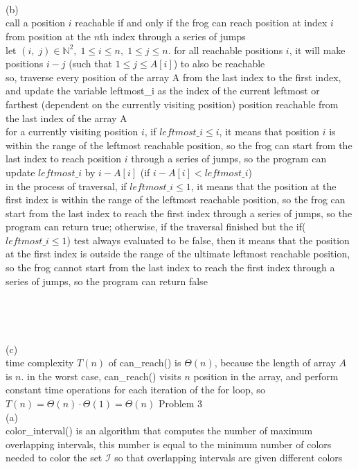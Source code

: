 \documentclass[12pt,border=4pt,multi]{article} %
\begin{document}
\\
\\
\\
(b)\\
call a position $i$ reachable if and only if the frog can reach position at index $i$ from position at the $n$th index through a series of jumps\\
let $(i,\; j) \in \mathbb{N}^2,\; 1 \leq i \leq n,\; 1 \leq j \leq n$. for all reachable positions $i$, it will make positions $i - j$ (such that $1 \leq j \leq A[i]$) to also be reachable\\
so, traverse every position of the array A from the last index to the first index, and update the variable leftmost\_i as the index of the current leftmost or farthest (dependent on the currently visiting position) position reachable from the last index of the array A\\
for a currently visiting position $i$, if $leftmost\_i \leq i$, it means that position $i$ is within the range of the leftmost reachable position, so the frog can start from the last index to reach position $i$ through a series of jumps, so the program can update $leftmost\_i$ by $i - A[i]$ (if $i - A[i] < leftmost\_i$)\\
in the process of traversal, if $leftmost\_i \leq 1$, it means that the position at the first index is within the range of the leftmost reachable position, so the frog can start from the last index to reach the first index through a series of jumps, so the program can return true; otherwise, if the traversal finished but the if($leftmost\_i \leq 1$) test always evaluated to be false, then it means that the position at the first index is outside the range of the ultimate leftmost reachable position, so the frog cannot start from the last index to reach the first index through a series of jumps, so the program can return false\\
\\
\\
\\
\\
(c)\\
time complexity $T(n)$ of can\_reach() is $\Theta(n)$, because the length of array $A$ is $n$. in the worst case, can\_reach() visits $n$ position in the array, and perform constant time operations for each iteration of the for loop, so $T(n) = \Theta(n) \cdot \Theta(1) = \Theta(n)$
\newpage
\noindent
Problem 3\\
(a)\\
color\_interval() is an algorithm that computes the number of maximum overlapping intervals, this number is equal to the minimum number of colors needed to color the set $\mathcal{I}$ so that overlapping intervals are given different colors
\end{document}

